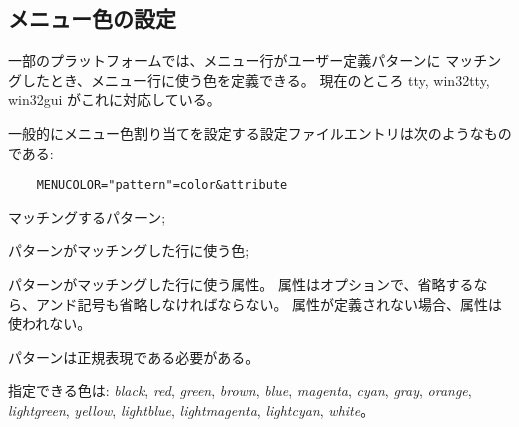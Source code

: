
\subsection*{メニュー色の設定}

一部のプラットフォームでは、メニュー行がユーザー定義パターンに
マッチングしたとき、メニュー行に使う色を定義できる。
現在のところ tty, win32tty, win32gui がこれに対応している。

一般的にメニュー色割り当てを設定する設定ファイルエントリは次のようなものである:
\begin{verbatim}
    MENUCOLOR="pattern"=color&attribute
\end{verbatim}

\blist{}
\item[\ib{pattern}]
マッチングするパターン;
\item[\ib{color}]
パターンがマッチングした行に使う色;
\item[\ib{attribute}]
パターンがマッチングした行に使う属性。
属性はオプションで、省略するなら、アンド記号も省略しなければならない。
属性が定義されない場合、属性は使われない。
\elist

パターンは正規表現である必要がある。

指定できる色は:
{\it black}, {\it red}, {\it green}, {\it brown},
{\it blue}, {\it magenta}, {\it cyan}, {\it gray}, {\it orange},
{\it lightgreen}, {\it yellow}, {\it lightblue}, {\it lightmagenta},
{\it lightcyan}, {\it white}。

